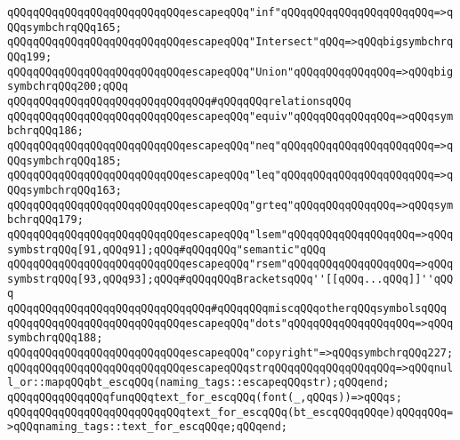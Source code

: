 \verb|qQQqqQQqqQQqqQQqqQQqqQQqqQQqescapeqQQq"inf"qQQqqQQqqQQqqQQqqQQqqQQq=>qQQqsymbchrqQQq165;|\newline
\newline
\verb|qQQqqQQqqQQqqQQqqQQqqQQqqQQqescapeqQQq"Intersect"qQQq=>qQQqbigsymbchrqQQq199;|\newline
\verb|qQQqqQQqqQQqqQQqqQQqqQQqqQQqescapeqQQq"Union"qQQqqQQqqQQqqQQq=>qQQqbigsymbchrqQQq200;qQQq|\newline
\newline
\verb|qQQqqQQqqQQqqQQqqQQqqQQqqQQqqQQq#qQQqqQQqrelationsqQQq|\newline
\verb|qQQqqQQqqQQqqQQqqQQqqQQqqQQqescapeqQQq"equiv"qQQqqQQqqQQqqQQq=>qQQqsymbchrqQQq186;|\newline
\verb|qQQqqQQqqQQqqQQqqQQqqQQqqQQqescapeqQQq"neq"qQQqqQQqqQQqqQQqqQQqqQQq=>qQQqsymbchrqQQq185;|\newline
\verb|qQQqqQQqqQQqqQQqqQQqqQQqqQQqescapeqQQq"leq"qQQqqQQqqQQqqQQqqQQqqQQq=>qQQqsymbchrqQQq163;|\newline
\verb|qQQqqQQqqQQqqQQqqQQqqQQqqQQqescapeqQQq"grteq"qQQqqQQqqQQqqQQq=>qQQqsymbchrqQQq179;|\newline
\newline
\verb|qQQqqQQqqQQqqQQqqQQqqQQqqQQqescapeqQQq"lsem"qQQqqQQqqQQqqQQqqQQq=>qQQqsymbstrqQQq[91,qQQq91];qQQq#qQQqqQQq"semantic"qQQq|\newline
\verb|qQQqqQQqqQQqqQQqqQQqqQQqqQQqescapeqQQq"rsem"qQQqqQQqqQQqqQQqqQQq=>qQQqsymbstrqQQq[93,qQQq93];qQQq#qQQqqQQqBracketsqQQq''[[qQQq...qQQq]]''qQQq|\newline
\newline
\verb|qQQqqQQqqQQqqQQqqQQqqQQqqQQqqQQq#qQQqqQQqmiscqQQqotherqQQqsymbolsqQQq|\newline
\verb|qQQqqQQqqQQqqQQqqQQqqQQqqQQqescapeqQQq"dots"qQQqqQQqqQQqqQQqqQQq=>qQQqsymbchrqQQq188;|\newline
\verb|qQQqqQQqqQQqqQQqqQQqqQQqqQQqescapeqQQq"copyright"=>qQQqsymbchrqQQq227;|\newline
\newline
\verb|qQQqqQQqqQQqqQQqqQQqqQQqqQQqescapeqQQqstrqQQqqQQqqQQqqQQqqQQq=>qQQqnull_or::mapqQQqbt_escqQQq(naming_tags::escapeqQQqstr);qQQqend;|\newline
\newline
\verb|qQQqqQQqqQQqqQQqfunqQQqtext_for_escqQQq(font(_,qQQqs))=>qQQqs;|\newline
\verb|qQQqqQQqqQQqqQQqqQQqqQQqqQQqtext_for_escqQQq(bt_escqQQqqQQqe)qQQqqQQq=>qQQqnaming_tags::text_for_escqQQqe;qQQqend;|\newline
